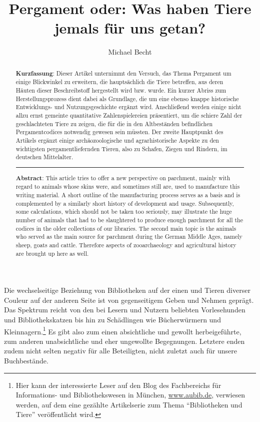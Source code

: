 \documentclass[a4paper,
fontsize=11pt,
oneside,
numbers=noperiodatend,
parskip=half-,
bibliography=totoc,
final
]{scrartcl}
\title{\LARGE{Pergament oder: Was haben Tiere jemals für uns getan?}}%
\author{Michael Becht} %
\date{}
\begin{document}
\maketitle
\thispagestyle{fancyplain} 

\begin{abstract}
\noindent
\textbf{Kurzfassung}: Dieser Artikel unternimmt den Versuch, das Thema
Pergament um einige Blickwinkel zu erweitern, die hauptsächlich die
Tiere betreffen, aus deren Häuten dieser Beschreibstoff hergestellt wird
bzw. wurde. Ein kurzer Abriss zum Herstellungsprozess dient dabei als
Grundlage, die um eine ebenso knappe historische Entwicklungs- und
Nutzungsgeschichte ergänzt wird. Anschließend werden einige nicht allzu
ernst gemeinte quantitative Zahlenspielereien präsentiert, um die
schiere Zahl der geschlachteten Tiere zu zeigen, die für die in den
Altbeständen befindlichen Pergamentcodices notwendig gewesen sein
müssten. Der zweite Hauptpunkt des Artikels ergänzt einige
archäozoologische und agrarhistorische Aspekte zu den wichtigsten
pergamentliefernden Tieren, also zu Schafen, Ziegen und Rindern, im
deutschen Mittelalter.

\begin{center}\rule{0.5\linewidth}{0.5pt}\end{center}

\textbf{Abstract}: This article tries to offer a new perspective on
parchment, mainly with regard to animals whose skins were, and sometimes
still are, used to manufacture this writing material. A short outline of
the manufacturing process serves as a basis and is complemented by a
similarly short history of development and usage. Subsequently, some
calculations, which should not be taken too seriously, may illustrate
the huge number of animals that had to be slaughtered to produce enough
parchment for all the codices in the older collections of our libraries.
The second main topic is the animals who served as the main source for
parchment during the German Middle Ages, namely sheep, goats and cattle.
Therefore aspects of zooarchaeology and agricultural history are brought
up here as well.
\end{abstract}

Die wechselseitige Beziehung von Bibliotheken auf der einen und Tieren
diverser Couleur auf der anderen Seite ist von gegenseitigem Geben und
Nehmen geprägt. Das Spektrum reicht von den bei Lesern und Nutzern
beliebten Vorlesehunden und Bibliothekskatzen bis hin zu Schädlingen wie
Bücherwürmern und Kleinnagern.\footnote{Hier kann der interessierte
  Leser auf den Blog des Fachbereichs für Informations- und
  Bibliothekswesen in München,
  \href{http://www.aubib.de/}{{www.aubib.de}}, verwiesen werden, auf dem
  eine gezählte Artikelserie zum Thema \enquote{Bibliotheken und Tiere}
  veröffentlicht wird.} Es gibt also zum einen absichtliche und gewollt
herbeigeführte, zum anderen unabsichtliche und eher ungewollte
Begegnungen. Letztere enden zudem nicht selten negativ für alle
Beteiligten, nicht zuletzt auch für unsere Buchbestände.
\end{document}
